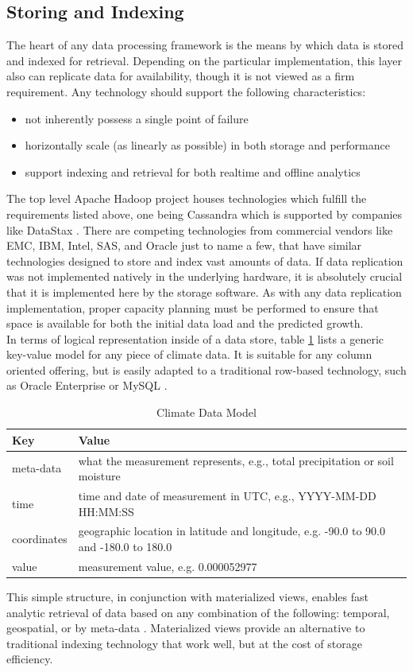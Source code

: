\subsection{Storing and Indexing}
 The heart of any data processing framework is the means by which data is stored and indexed for retrieval. Depending on the particular implementation, this layer also can replicate data for availability, though it is not viewed as a firm requirement. Any technology should support the following characteristics:
\begin{itemize}
	\item not inherently possess a single point of failure
	\item horizontally scale (as linearly as possible) in both storage and performance
	\item support indexing and retrieval for both realtime and offline analytics
\end{itemize}
The top level Apache Hadoop project houses technologies which fulfill the requirements listed above, one being Cassandra which is supported by companies like DataStax \cite{cassandra}. There are competing technologies from commercial vendors like EMC, IBM, Intel, SAS, and Oracle just to name a few, that have similar technologies designed to store and index vast amounts of data. If data replication was not implemented natively in the underlying hardware, it is absolutely crucial that it is implemented here by the storage software. As with any data replication implementation, proper capacity planning must be performed to ensure that space is available for both the initial data load and the predicted growth.\\

In terms of logical representation inside of a data store, table \ref{model} lists a generic key-value model for any piece of climate data. It is suitable for any column oriented offering, but is easily adapted to a traditional row-based technology, such as Oracle Enterprise or MySQL .
\begin{table}[htbp]
    \centering
    \begin{tabular}{l l}
        \hline
	Key & Value \\ [0.5ex]
	\hline
	meta-data & what the measurement represents, e.g., total precipitation or soil moisture\\
	time & time and date of measurement in UTC, e.g., YYYY-MM-DD HH:MM:SS\\
	coordinates & geographic location in latitude and longitude, e.g. -90.0 to 90.0 and -180.0 to 180.0\\
	value & measurement value, e.g. 0.000052977\\
	\hline
    \end{tabular}
    \caption{Climate Data Model}
    \label{model}
\end{table}
This simple structure, in conjunction with materialized views, enables fast analytic retrieval of data based on any combination of the following: temporal, geospatial, or by meta-data \cite{materialized_views}. Materialized views provide an alternative to traditional indexing technology that work well, but at the cost of storage efficiency. 
